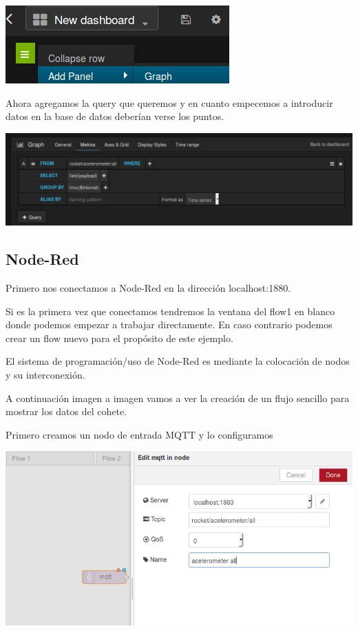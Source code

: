 \documentclass[12pt, a4paper, oneside, titlepage]{article}
\begin{document}
\includegraphics[width=0.9\linewidth,keepaspectratio]{img/grafana-4.png}

Ahora agregamos la query que queremos y en cuanto empecemos a introducir datos en la base de datos deberían verse los puntos.

\includegraphics[width=0.9\linewidth,keepaspectratio]{img/grafana-5.png}

\subsection{Node-Red}

Primero nos conectamos a Node-Red en la dirección localhost:1880. 

Si es la primera vez que conectamos tendremos la ventana del flow1 en blanco donde podemos empezar a trabajar directamente. En caso contrario podemos crear un flow nuevo para el propósito de este ejemplo.

El sistema de programación/uso de Node-Red es mediante la colocación de nodos y su interconexión.

A continuación imagen a imagen vamos a ver la creación de un flujo sencillo para mostrar los datos del cohete.

Primero creamos un nodo de entrada MQTT y lo configuramos

\includegraphics[width=0.9\linewidth,keepaspectratio]{img/node-1.png}
\end{document}

